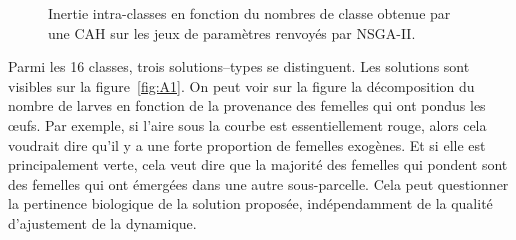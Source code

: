 \begin{figure}[ht]
 \centering
 \caption{Inertie intra-classes en fonction du nombres de classe obtenue par une CAH sur les jeux de paramètres renvoyés par NSGA-II.}
 \label{fig:caha}
\end{figure}


Parmi les 16 classes, trois solutions--types se distinguent.
Les solutions sont visibles sur la figure~\ref{fig:A1}.
On peut voir sur la figure la décomposition du nombre de larves en fonction de la provenance des femelles qui ont pondus les œufs.
Par exemple, si l'aire sous la courbe est essentiellement rouge, alors cela voudrait dire qu'il y a une forte proportion de femelles exogènes.
Et si elle est principalement verte, cela veut dire que la majorité des femelles qui pondent sont des femelles qui ont émergées dans une autre sous-parcelle. 
Cela peut questionner la pertinence biologique de la solution proposée, indépendamment de la qualité d'ajustement de la dynamique.


